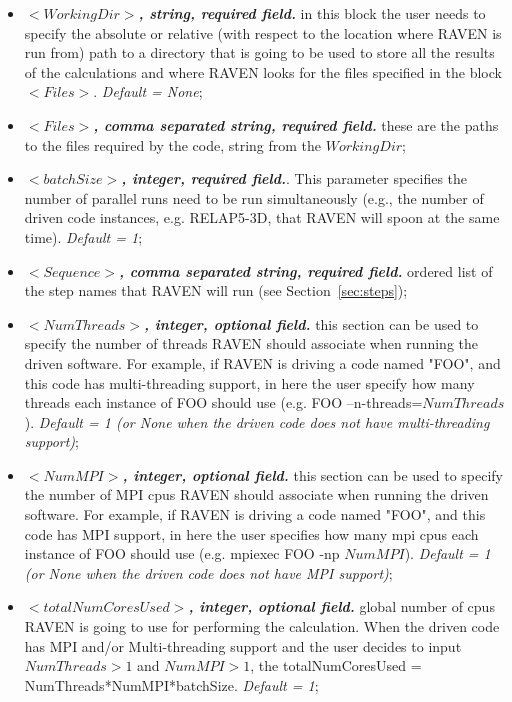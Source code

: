\begin{itemize}
\item $<WorkingDir>$\textbf{\textit{, string, required field.}} in this block the user needs to specify the absolute or relative (with respect to the location where RAVEN is run from) path to a directory that is going to be used to store all the results of the calculations and where RAVEN looks for the files specified in the block $<Files>$. \textit{Default = None};

\item $<Files>$\textbf{\textit{, comma separated string, required field.}} these are the paths to the files required by the code, string from the $WorkingDir$; 

\item $<batchSize>$\textbf{\textit{, integer, required field.}}. This parameter specifies the number of parallel runs need to be run simultaneously (e.g., the number of driven code instances, e.g. RELAP5-3D, that RAVEN will spoon at the same time). \textit{Default = 1};

\item $<Sequence>$\textbf{\textit{, comma separated string, required field.}} ordered list of the step names that RAVEN will run (see Section~\ref{sec:steps});

\item $<NumThreads>$\textbf{\textit{, integer, optional field.}} this section can be used to specify the number of threads RAVEN should associate when running the driven software. For example, if RAVEN is driving a code named "FOO", and this code has multi-threading support, in here the user specify how many threads each instance of FOO should use (e.g. FOO --n-threads=$NumThreads$). \textit{Default = 1 (or None when the driven code does not have multi-threading support)};

\item $<NumMPI>$\textbf{\textit{, integer, optional field.}}  this section can be used to specify the number of MPI cpus RAVEN should associate when running the driven software. For example, if RAVEN is driving a code named "FOO", and this code has MPI support, in here the user specifies how many mpi cpus each instance of FOO should use (e.g. mpiexec FOO -np $NumMPI$). \textit{Default = 1 (or None when the driven code does not have MPI support)};

\item $<totalNumCoresUsed>$\textbf{\textit{, integer, optional field.}}  global number of cpus RAVEN is going to use for performing the calculation. When the driven code has MPI and/or  Multi-threading support and the user decides to input $NumThreads > 1$  and $NumMPI > 1$, the totalNumCoresUsed = NumThreads*NumMPI*batchSize. \textit{Default = 1};


\end{itemize}
